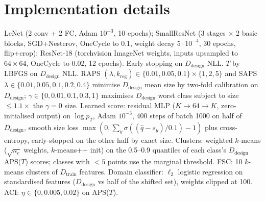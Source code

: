 \documentclass{article}
\newcommand{\ddes}{D_\text{design}}
\begin{document}
\section{Implementation details}
LeNet (2 conv + 2 FC, Adam $10^{-3}$, 10 epochs); SmallResNet (3 stages $\times$ 2 basic blocks, SGD+Nesterov, OneCycle to 0.1, weight decay
$5\cdot10^{-4}$, 30 epochs, flip+crop); ResNet-18 (torchvision ImageNet weights, inputs upsampled to $64\times64$, OneCycle to 0.02, 12 epochs).
Early stopping on $\ddes$ NLL. $T$ by LBFGS on $\ddes$ NLL. RAPS $(\lambda,k_\text{reg})\in\{0.01,0.05,0.1\}\times\{1,2,5\}$ and SAPS
$\lambda\in\{0.01,0.05,0.1,0.2,0.4\}$ minimise $\ddes$ mean size by two-fold calibration on $\ddes$; $\gamma\in\{0,0.01,0.1,0.3,1\}$ maximises
$\ddes$ worst class subject to size $\le1.1\times$ the $\gamma{=}0$ size. Learned score: residual MLP ($K\!\to\!64\!\to\!K$, zero-initialised
output) on $\log p_T$, Adam $10^{-3}$, 400 steps of batch 1000 on half of $\ddes$, smooth size loss $\max(0,\sum_y\sigma((\hat q-s_y)/0.1)-1)$
plus cross-entropy, early-stopped on the other half by exact size. Clusters: weighted $k$-means ($\sqrt{n_c}$ weights, $k$-means++ init)
on the 0.5--0.9 quantiles of each class's $\ddes$ APS($T$) scores; classes with $<5$ points use the marginal threshold. FSC: 10 $k$-means
clusters of $D_\text{train}$ features. Domain classifier: $\ell_2$ logistic regression on standardised features ($\ddes$ vs half of the
shifted set), weights clipped at 100. ACI: $\eta\in\{0,0.005,0.02\}$ on APS($T$).
\end{document}
